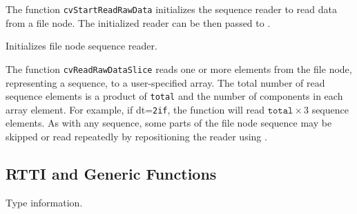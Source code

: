 \begin{description}
\end{description}

The function \texttt{cvStartReadRawData} initializes the sequence reader to read data from a file node. The initialized reader can be then passed to .

\label{ReadRawDataSlice}

Initializes file node sequence reader.


\begin{description}
\end{description}

The function \texttt{cvReadRawDataSlice} reads one or more elements from
the file node, representing a sequence, to a user-specified array. The
total number of read sequence elements is a product of \texttt{total}
and the number of components in each array element. For example, if
dt=\texttt{2if}, the function will read $\texttt{total} \times 3$
sequence elements. As with any sequence, some parts of the file node
sequence may be skipped or read repeatedly by repositioning the reader
using .

\fi

\subsection{RTTI and Generic Functions}

\ifC
{}\label{CvTypeInfo}

Type information.

